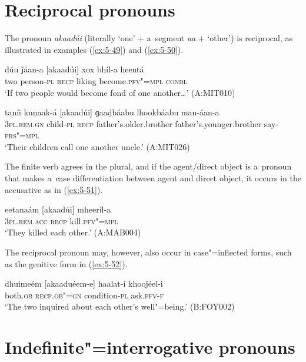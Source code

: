 \section{Reciprocal pronouns}
\label{sec:5-6}

The pronoun \textit{akaadúi} (literally `one' + a~segment \textit{aa} + `other') is reciprocal,
as illustrated in examples (\ref{ex:5-49}) and (\ref{ex:5-50}).

\begin{exe}
\ex
\label{ex:5-49}
\gll dúu ǰáan-a [akaadúi] xox bhíl-a heentá\\
two person-\textsc{pl} \textsc{recp} liking become.\textsc{pfv"=mpl} \textsc{condl}\\
\glt `If two people would become fond of one another{\ldots}' (A:MIT010)

\ex
\label{ex:5-50}
\gll taníi kuṇaak-á [akaadúi] ɡaaḍbáabu lhookbáabu man-áan-a\\
\textsc{3pl.rem.gn} child-\textsc{pl} \textsc{recp} father's.older.brother father's.younger.brother say-\textsc{prs"=mpl} \\
\glt `Their children call one another uncle.' (A:MIT026)
\end{exe}

The finite verb agrees in the plural, and if the agent/direct object is a~pronoun that makes a~case differentiation between agent and direct object, it occurs in the accusative as in (\ref{ex:5-51}).
\begin{exe}
\ex
\label{ex:5-51}
\gll eetanaám [akaadúi] mheeríl-a\\
\textsc{3pl.rem.acc} \textsc{recp } kill.\textsc{pfv"=mpl}\\
\glt `They killed each other.' (A:MAB004)
\end{exe}

The reciprocal pronoun may, however, also occur in case"=inflected forms, such as the genitive form in (\ref{ex:5-52}). 
\begin{exe}
\ex
\label{ex:5-52}
\gll dhuimeém [akaaduéem-e] haalat-í khooǰéel-i\\
both.\textsc{ob} \textsc{recp.ob"=gn } condition-\textsc{pl} ask.\textsc{pfv-f}\\
\glt `The two inquired about each other's well"=being.' (B:FOY002)
\end{exe}

\section{Indefinite"=interrogative pronouns}
\label{sec:5-7}


